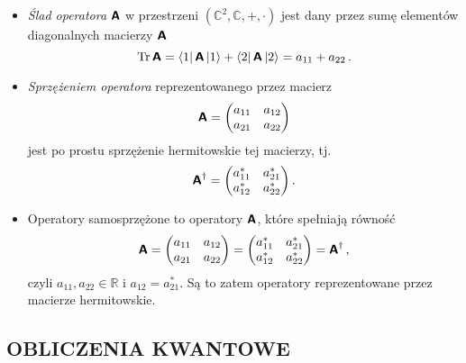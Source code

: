 \documentclass{myclass}
\begin{document}
\begin{itemize}
    
    \item \textit{Ślad operatora} \(\boldsymbol{\mathsf{A}}\) w przestrzeni \((\mathbb{C}^2,\mathbb{C},+,\cdot)\)
    jest dany przez sumę elementów diagonalnych macierzy \(\boldsymbol{\mathsf{A}}\)
    \begin{equation*}
        \Trace{\oper{A}} = \bra{1}\oper{A}\ket{1} + \bra{2}\oper{A}\ket{2} = a_{11} + a_{22}\,.
    \end{equation*}

    \item \textit{Sprzężeniem operatora} reprezentowanego przez macierz
    \begin{equation*}
        \oper{A} = \mqty(a_{11} & a_{12} \\ a_{21} & a_{22})
    \end{equation*}
    jest po prostu sprzężenie hermitowskie tej macierzy, tj.
    \begin{equation*}
        \oper{A}^\dagger = \mqty(a^*_{11} & a^*_{21} \\ a^*_{12} & a^*_{22})\,.
    \end{equation*}

    \item Operatory samosprzężone to operatory \(\boldsymbol{\mathsf{A}}\), które spełniają równość
    \begin{equation*}
        \oper{A} = \mqty(a_{11} & a_{12} \\ a_{21} & a_{22}) = \mqty(a^*_{11} & a^*_{21} \\ a^*_{12} & a^*_{22}) = \oper{A}^\dagger\,,
    \end{equation*}
    czyli \(a_{11},a_{22}\in\mathbb{R}\) i \(a_{12} = a_{21}^*\). Są to zatem operatory
    reprezentowane przez macierze hermitowskie.

\end{itemize}


\subsection{OBLICZENIA KWANTOWE}





%
%
%
%
%
%
%
%
%
%
%
\end{document}
